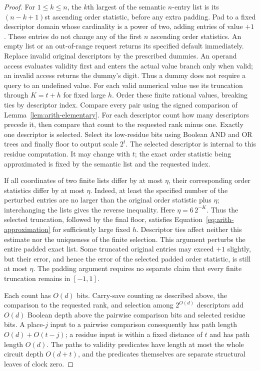 \begin{proof}
For $1\le k\le n$, the $k$th largest of the semantic $n$-entry list
is its $(n-k+1)$st ascending order statistic, before any extra padding.
Pad to a fixed descriptor domain whose cardinality is a power of
two, adding entries of value $+1$.  These entries do not change
any of the first $n$ ascending order statistics.  An empty list or
an out-of-range request returns its specified default immediately.
Replace invalid original descriptors by the prescribed dummies.
An operand access evaluates validity first and enters the actual
value branch only when valid; an invalid access returns the dummy's
digit.  Thus a dummy does not require a query to an undefined value.
For each valid numerical value use its truncation through
$K=t+h$ for fixed large $h$.  Order these finite rational values,
breaking ties by descriptor index.  Compare every pair using the
signed comparison of Lemma~\ref{lem:arith-elementary}.  For each
descriptor count how many descriptors precede it, then compare
that count to the requested rank minus one.  Exactly one
descriptor is selected.  Select its low-residue bits using Boolean
AND and OR trees and finally floor to output scale $2^t$.
The selected descriptor is internal to this residue computation.  It
may change with $t$; the exact order statistic being approximated is
fixed by the semantic list and the requested index.

If all coordinates of two finite lists differ by at most $\eta$,
their corresponding order statistics differ by at most $\eta$.
Indeed, at least the specified number of the perturbed entries
are no larger than the original order statistic plus $\eta$;
interchanging the lists gives the reverse inequality.  Here
$\eta=6\,2^{-K}$.  Thus the selected truncation, followed by the
final floor, satisfies Equation~\eqref{eq:arith-approximation}
for sufficiently large fixed $h$.  Descriptor ties affect neither
this estimate nor the uniqueness of the finite selection.
This argument perturbs the entire padded exact list.  Some truncated
original entries may exceed $+1$ slightly, but their error, and hence
the error of the selected padded order statistic, is still at most
$\eta$.  The padding argument requires no separate claim that every
finite truncation remains in $[-1,1]$.

Each count has $O(d)$ bits.  Carry-save counting as described
above, the comparison to the requested rank, and selection among
$2^{O(d)}$ descriptors add $O(d)$ Boolean depth above the
pairwise comparison bits and selected residue bits.  A
place-$j$ input to a pairwise comparison consequently has path
length $O(d)+O(t-j)$; a residue input is within a fixed distance
of $t$ and has path length $O(d)$.  The paths to validity predicates
have length at most the whole circuit depth $O(d+t)$, and the
predicates themselves are separate structural leaves of clock zero.


\end{proof}
